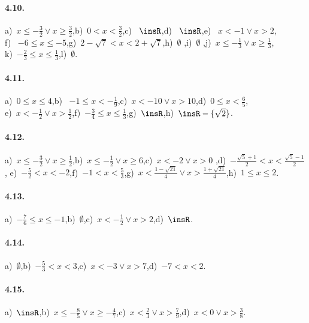 \paragraph{4.10.} a)~$x\le -\frac 3 2\vee x\ge \frac 3 2$,\quad b)~$0<x<\frac 3 2$,\quad c)~ $\insR$,\quad d)~ $\insR$,\quad e)~ $x<-1\vee x>2$,\protect\\
f)~ $-6\le x\le -5$,\quad g)~$2-\sqrt 7<x<2+\sqrt 7$,\quad h)~$\emptyset $ ,\quad i)~$\emptyset $ ,\quad j)~$x\le -\frac 1 3\vee x\ge \frac 1 3$,\protect\\
k)~$-\frac 2 3\le x\le \frac 1 3$,\quad l)~$\emptyset $.

\paragraph{4.11.} a)~$0\le x\le 4$,\quad b)~ $-1\le x<-\frac 1 9$,\quad c)~$x<-10\vee x>10$,\quad d)~$0\le x<\frac 6 5$,\protect\\
e)~$x<-\frac 1 2\vee x>\frac 1 2$,\quad f)~$-\frac 3 4\le x\le \frac 1 3$,\quad g)~$\insR$,\quad h)~$\insR-\{\sqrt 2\}$.

\paragraph{4.12.} a)~$x\le -\frac 3 2\vee x\ge \frac 1 2$,\quad b)~$x\le -\frac 1 2\vee x\ge 6$,\quad c)~$x<-2\vee x>0$ ,\quad d)~$-\frac{\sqrt 5+1} 2<x<\frac{\sqrt 5-1} 2$,\quad
e)~$-\frac 5 2<x<-2$,\quad f)~$-1<x<\frac 5 3$,\quad g)~$x<\frac{1-\sqrt{21}} 4\vee x>\frac{1+\sqrt{21}} 4$,\quad h)~$1\le x\le 2$.

\paragraph{4.13.} a)~$-\frac 7 6\le x\le -1$,\quad b)~$\emptyset $,\quad c)~$x<-\frac 1 2\vee x>2$,\quad d)~$\insR$.

\paragraph{4.14.} a)~$\emptyset$,\quad b)~$-\frac{5}{3}<x<3$,\quad c)~$x<-3\vee x>7$,\quad d)~$-7<x<2$.

\paragraph{4.15.} a)~$\insR$,\quad b)~$x\le -\frac 8 5\vee x\ge -\frac 4 7$,\quad c)~$x<\frac 2 3\vee x>\frac 7 9$,\quad d)~$x<0\vee x>\frac 3 8$.

